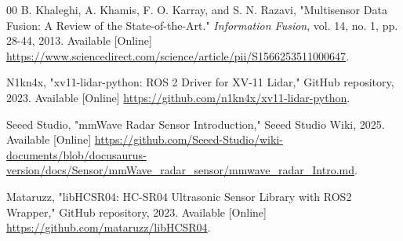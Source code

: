 \documentclass[conference]{IEEEtran}
\begin{document}
\begin{thebibliography}{00}
B. Khaleghi, A. Khamis, F. O. Karray, and S. N. Razavi, 
"Multisensor Data Fusion: A Review of the State-of-the-Art." 
\textit{Information Fusion}, vol. 14, no. 1, pp. 28-44, 2013. 
Available [Online] \href{https://www.sciencedirect.com/science/article/abs/pii/S1566253511000558}{https://www.sciencedirect.com/science/article/pii/S1566253511000647}.

N1kn4x, "xv11-lidar-python: ROS 2 Driver for XV-11 Lidar," GitHub repository, 2023. Available [Online] \href{https://github.com/n1kn4x/xv11_lidar_python}{https://github.com/n1kn4x/xv11-lidar-python}.

Seeed Studio, "mmWave Radar Sensor Introduction," Seeed Studio Wiki, 2025. Available [Online] \url{https://github.com/Seeed-Studio/wiki-documents/blob/docusaurus-version/docs/Sensor/mmWave_radar_sensor/mmwave_radar_Intro.md}.

Mataruzz, "libHCSR04: HC-SR04 Ultrasonic Sensor Library with ROS2 Wrapper," GitHub repository, 2023. Available [Online] \href{https://github.com/mataruzz/libHCSR04}{https://github.com/mataruzz/libHCSR04}.

\end{thebibliography}
\end{document}
